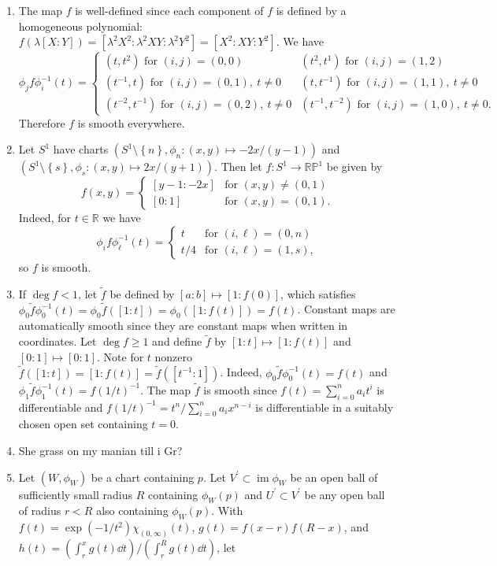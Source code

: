 \documentclass[11pt,leqno]{article}
\theoremstyle{plain}
\theoremstyle{definition}
\numberwithin{equation}{section}
\numberwithin{lem}{section}
\newcommand{\cbr}[1]{\left\{#1\right\}}
\DeclareMathOperator{\im}{im}
\begin{document}
\begin{enumerate}
\begin{enumerate}
    \end{enumerate}
    \item The map $f$ is well-defined since each component of $f$ is defined by a homogeneous polynomial: $f(\lambda[X:Y]) = [\lambda^2X^2:\lambda^2XY:\lambda^2Y^2] = [X^2:XY:Y^2]$. We have  
    \[\phi_jf\phi_i^{-1}(t)=\begin{cases}
      (t,t^2) \text{ for } (i,j) = (0,0) & (t^2,t^1) \text{ for } (i,j) = (1,2)\\
      (t^{-1},t) \text{ for } (i,j) = (0,1), ~t\neq 0 & (t,t^{-1}) \text{ for } (i,j) = (1,1),~ t\neq 0\\
      (t^{-2},t^{-1}) \text{ for } (i,j) = (0,2),~ t\neq 0 & (t^{-1},t^{-2}) \text{ for } (i,j) = (1,0),~ t\neq 0.
    \end{cases}\]
    Therefore $f$ is smooth everywhere.
    \item Let $S^1$ have charts $(S^1\setminus\cbr{n},\phi_n\colon(x,y)\mapsto -2x/(y-1))$ and $(S^1\setminus\cbr{s},\phi_s\colon (x,y)\mapsto 2x/(y+1))$. Then let $f\colon S^1\to \mathbb{RP}^1$ be given by 
    \[f(x,y) = \begin{cases}
      [y-1:-2x]& \text{for }(x,y) \neq (0,1)\\
      [0: 1] & \text{for }(x,y) = (0,1).
    \end{cases}\]
    Indeed, for $t\in\mathbb R$ we have 
    \[\phi_if\phi_\ell^{-1}(t) = \begin{cases}
       t & \text{for } (i,\ell) = (0,n)\\
       t/4 & \text{for } (i,\ell) = (1,s),
    \end{cases}\] so $f$ is smooth.
    \item If $\deg f < 1$, let $\tilde f$ be defined by $[a:b]\mapsto [1:f(0)]$, which satisfies $\phi_0\tilde f\phi_0^{-1}(t) = \phi_0\tilde f([1:t]) = \phi_0([1:f(t)]) = f(t)$. Constant maps are automatically smooth since they are constant maps when written in coordinates. Let $\deg f \geq 1$ and define $\tilde f$ by $[1:t]\mapsto [1:f(t)]$ and $[0:1]\mapsto [0:1]$. Note for $t$ nonzero $\tilde f([1:t]) = [1:f(t)] = \tilde f([t^{-1}:1])$. Indeed, $\phi_0\tilde f\phi_0^{-1}(t) = f(t)$ and $\phi_1\tilde f\phi_1^{-1}(t) = f(1/t)^{-1}$. The map $\tilde f$ is smooth since $f(t) = \sum_{i=0}^n a_it^i$ is differentiable and $f(1/t)^{-1} = t^n/\sum_{i=0}^n a_ix^{n-i}$ is differentiable in a suitably chosen open set containing $t=0$. 
    \item She grass on my manian till i Gr?
    \item Let $(W,\phi_W)$ be a chart containing $p$. Let $V^\prime\subset \im\phi_W$ be an open ball of sufficiently small radius $R$ containing $\phi_W(p)$ and $U^\prime\subset V^\prime$ be any open ball of radius $r<R$ also containing $\phi_W(p)$. With $f(t) = \exp(-1/t^2)\chi_{(0,\infty)}(t)$, $g(t) = f(x-r)f(R-x)$, and $h(t) = (\int_r^xg(t)\dd t)/(\int_r^Rg(t)\dd t)$, let 

\end{enumerate}
\end{document}
